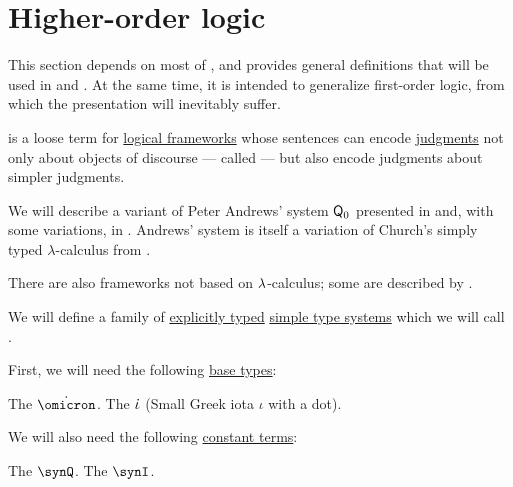 \section{Higher-order logic}\label{sec:higher_order_logic}

This section depends on most of , and provides general definitions that will be used in  and . At the same time, it is intended to generalize first-order logic, from which the presentation will inevitably suffer.

\begin{concept}\label{con:higher_order_logic}
   is a loose term for \hyperref[def:logical_framework]{logical frameworks} whose sentences can encode \hyperref[con:judgment]{judgments} not only about objects of discourse --- called  --- but also encode judgments about simpler judgments.

  We will describe a variant of Peter Andrews' system \( \textsf{Q}_0 \) presented in \cite[\S 51]{Andrews2002Logic} and, with some variations, in . Andrews' system is itself a variation of Church's simply typed \( \lambda \)-calculus from \cite{Church1940STT}.

  There are also frameworks not based on \( \mathrm{\lambda} \)-calculus; some are described by .
\end{concept}

\begin{definition}\label{def:simply_typed_hol}\mimprovised
  We will define a family of \hyperref[def:simple_type_system_style]{explicitly typed} \hyperref[def:simple_type_system]{simple type systems} which we will call .

  First, we will need the following \hyperref[def:simple_type]{base types}:
  \begin{thmenum}[series=def:simply_typed_hol]
     The  \( \syn\omicron \).
     The  \( \dot{\iota} \) (Small Greek iota \( \iota \) with a dot).
  \end{thmenum}

  We will also need the following \hyperref[def:lambda_term]{constant terms}:
  \begin{thmenum}[resume=def:simply_typed_hol]
     The  \( \synQ \).
     The  \( \synI \).
  \end{thmenum}
\end{definition}

\begin{definition}\label{def:nth_order_logic}
\end{definition}
